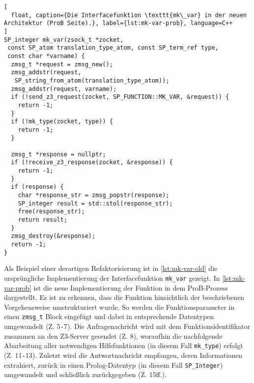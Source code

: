 \begin{lstlisting}[
  float, caption={Die Interfacefunktion \texttt{mk\_var} in der neuen Architektur (ProB Seite).}, label={lst:mk-var-prob}, language=C++
]
SP_integer mk_var(zsock_t *zocket,
 const SP_atom translation_type_atom, const SP_term_ref type,
 const char *varname) {
  zmsg_t *request = zmsg_new();
  zmsg_addstr(request,
   SP_string_from_atom(translation_type_atom));
  zmsg_addstr(request, varname);
  if (!send_z3_request(zocket, SP_FUNCTION::MK_VAR, &request)) {
    return -1;
  }
  if (!mk_type(zocket, type)) {
    return -1;
  }

  zmsg_t *response = nullptr;
  if (!receive_z3_response(zocket, &response)) {
    return -1;
  }
  if (response) {
    char *response_str = zmsg_popstr(response);
    SP_integer result = std::stol(response_str);
    free(response_str);
    return result;
  }
  zmsg_destroy(&response);
  return -1;
}
\end{lstlisting}

Als Beispiel einer derartigen Refaktorisierung ist in \cref{lst:mk-var-old} die ursprüngliche Implementierung der Interfacefunktion \texttt{mk\_var} gezeigt.
In \cref{lst:mk-var-prob} ist die neue Implementierung der Funktion in dem ProB-Prozess dargestellt.
Es ist zu erkennen, dass die Funktion hinsichtlich der beschriebenen Vorgehensweise umstrukturiert wurde.
So werden die Funktionsparameter in einen \texttt{zmsg\_t} Block eingefügt und dabei in entsprechende Datentypen umgewandelt (Z. 5\texttt{-}7).
Die Anfragenachricht wird mit dem Funktionsidentifikator zusammen an den Z3-Server gesendet (Z. 8), woraufhin
die nachfolgende Abarbeitung aller notwendigen Hilfsfunktionen (in diesem Fall \texttt{mk\_type}) erfolgt (Z. 11\texttt{-}13).
Zuletzt wird die Antwortnachricht empfangen, deren Informationen extrahiert, zurück in einen Prolog-Datentyp (in diesem Fall \texttt{SP\_Integer}) umgewandelt und schließlich zurückgegeben (Z. 15ff.).

